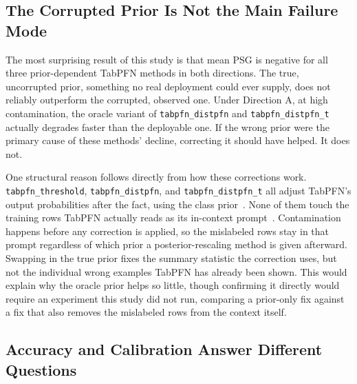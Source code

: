 \subsection{The Corrupted Prior Is Not the Main Failure Mode}
\label{sec:discussion-prior}

The most surprising result of this study is that mean PSG is negative for
all three prior-dependent TabPFN methods in both directions. The true,
uncorrupted prior, something no real deployment could ever supply, does
not reliably outperform the corrupted, observed one. Under Direction A,
at high contamination, the oracle variant of \texttt{tabpfn\_distpfn} and
\texttt{tabpfn\_distpfn\_t} actually degrades faster than the deployable
one. If the wrong prior were the primary cause of these methods'
decline, correcting it should have helped. It does not.

One structural reason follows directly from how these corrections work. \texttt{tabpfn\_threshold}, \texttt{tabpfn\_distpfn}, and
\texttt{tabpfn\_distpfn\_t} all adjust TabPFN's output probabilities after
the fact, using the class prior~\cite{saerens2002adjusting,lee2026distpfn}.
None of them touch the training rows TabPFN actually reads as its
in-context prompt~\cite{hollmann2023tabpfn,hollmann2025tabpfnv2}.
Contamination happens before any correction is applied, so the mislabeled
rows stay in that prompt regardless of which prior a posterior-rescaling
method is given afterward. Swapping in the true prior fixes the summary
statistic the correction uses, but not the individual wrong examples
TabPFN has already been shown. This would explain why the oracle prior
helps so little, though confirming it directly would require an
experiment this study did not run, comparing a prior-only fix against a
fix that also removes the mislabeled rows from the context itself.

\subsection{Accuracy and Calibration Answer Different Questions}
\label{sec:discussion-calibration}

